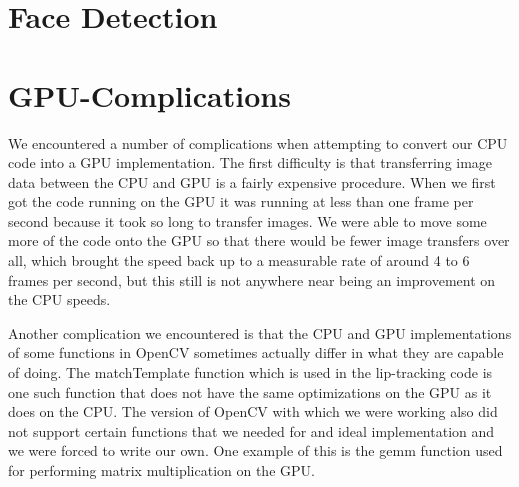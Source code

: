 \section{Face Detection}


\section{GPU-Complications}

We encountered a number of complications when attempting to convert our CPU code into a GPU implementation. The first difficulty is that transferring image data between the CPU and GPU is a fairly expensive procedure. When we first got the code running on the GPU it was running at less than one frame per second because it took so long to transfer images. We were able to move some more of the code onto the GPU so that there would be fewer image transfers over all, which brought the speed back up to a measurable rate of around 4 to 6 frames per second, but this still is not anywhere near being an improvement on the CPU speeds.

Another complication we encountered is that the CPU and GPU implementations of some functions in OpenCV sometimes actually differ in what they are capable of doing. The matchTemplate function which is used in the lip-tracking code is one such function that does not have the same optimizations on the GPU as it does on the CPU. The version of OpenCV with which we were working also did not support certain functions that we needed for and ideal implementation and we were forced to write our own. One example of this is the gemm function used for performing matrix multiplication on the GPU.